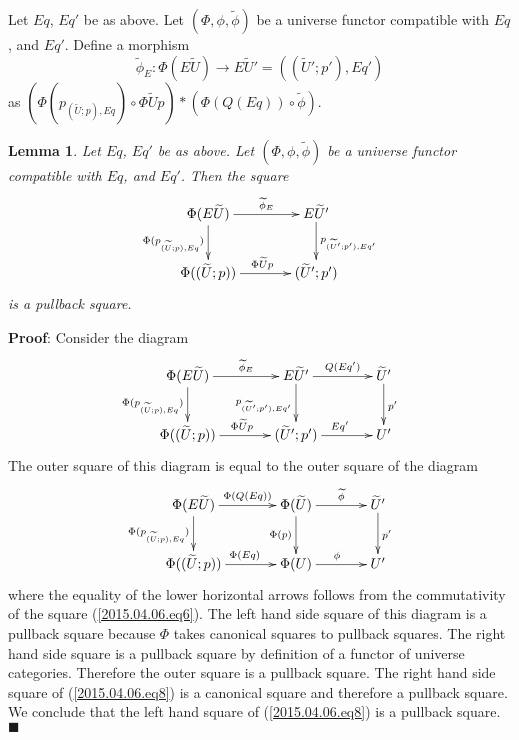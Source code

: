 \documentclass[12pt]{article}
\numberwithin{equation}{section}
\newenvironment{eq}{\begin{equation}}{\end{equation}}
\newenvironment{myproof}{{\bf Proof}:}{$\blacksquare$ \vskip 5mm }
\newtheorem{lemma}[proposition]{Lemma}
\newcommand{\llabel}[1]{\label{#1}}
\newcommand{\sr}{\rightarrow}
\newcommand{\wt}{\widetilde}
\begin{document}
%
Let $Eq$, $Eq'$ be as above. Let $(\Phi,\phi,\wt{\phi})$ be a universe functor
compatible with $Eq$, and $Eq'$. Define a morphism
%
$$\wt{\phi}_{E}:\Phi(E\wt{U})\sr E\wt{U}'=((\wt{U}';p'),Eq')$$
%
as $(\Phi(p_{(\wt{U};p),Eq})\circ \Phi\wt{U}p)*(\Phi(Q(Eq))\circ \wt{\phi})$.
%
\begin{lemma}
\llabel{2015.04.06.l4} Let $Eq$, $Eq'$ be as above. Let $(\Phi,\phi,\wt{\phi})$
be a universe functor compatible with $Eq$, and $Eq'$. Then the square
%
$$
\begin{xy}
          \xymatrix@C=3pc{ \Phi(E\wt{U}) \ar[r]^-{\wt{\phi}_{E}}
            \ar[d]_{\Phi(p_{(\wt{U};p),Eq})} & E\wt{U}'
            \ar[d]^{p_{(\wt{U}';p'),Eq'}}\\ \Phi((\wt{U};p))
            \ar[r]^{\Phi\wt{U}p} & (\wt{U}';p') }
\end{xy}
$$
%
is a pullback square.
%
\end{lemma} 
%
\begin{myproof}
Consider the diagram
%
\begin{eq}\llabel{2015.04.06.eq8}
\begin{xy}
          \xymatrix@C=3pc{ \Phi(E\wt{U})
            \ar[r]^-{\wt{\phi}_{E}}\ar[d]_{\Phi(p_{(\wt{U};p),Eq})} & E\wt{U}'
            \ar[r]^-{Q(Eq')}\ar[d]_{p_{(\wt{U}';p'),Eq'}} & \wt{U}'
            \ar[d]^{p'}\\ \Phi((\wt{U};p)) \ar[r]^{\Phi\wt{U}p} & (\wt{U}';p')
            \ar[r]^{Eq'} & U' }
\end{xy}
\end{eq}
%
The outer square of this diagram is equal to the outer square of the diagram
%
\begin{eq}\llabel{2015.04.06.eq7}
\begin{xy}
          \xymatrix@C=3pc{ \Phi(E\wt{U})
            \ar[r]^-{\Phi(Q(Eq))}\ar[d]_{\Phi(p_{(\wt{U};p),Eq})} &
            \Phi(\wt{U}) \ar[r]^-{\wt{\phi}}\ar[d]_{\Phi(p)} & \wt{U}'
            \ar[d]^{p'}\\ \Phi((\wt{U};p)) \ar[r]^{\Phi(Eq)} & \Phi(U)
            \ar[r]^{\phi} & U' }
\end{xy}
\end{eq}
%
where the equality of the lower horizontal arrows follows from the
commutativity of the square (\ref{2015.04.06.eq6}). The left hand side square
of this diagram is a pullback square because $\Phi$ takes canonical squares to
pullback squares. The right hand side square is a pullback square by definition
of a functor of universe categories. Therefore the outer square is a pullback
square. The right hand side square of (\ref{2015.04.06.eq8}) is a canonical
square and therefore a pullback square. We conclude that the left hand square
of (\ref{2015.04.06.eq8}) is a pullback square.
\end{myproof}
\end{document}
